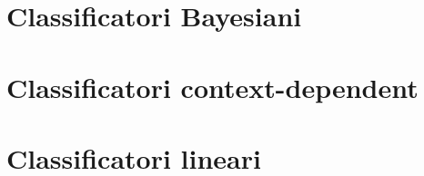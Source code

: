 \documentclass[italian, disablemarginnotes, allowcoloredmath]{../../../Resources/Utils/ClassNotes}
\begin{document}

\section{Classificatori Bayesiani}


\section{Classificatori context-dependent}


\section{Classificatori lineari}

\end{document}
